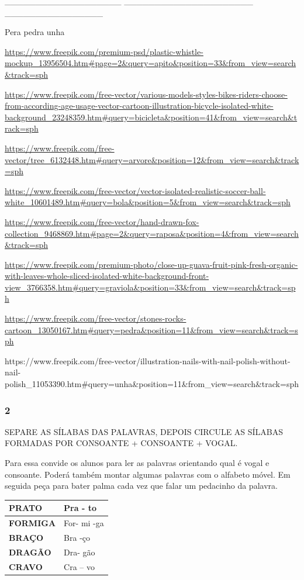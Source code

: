 \_\_\_\_\_\_\_\_\_\_\_\_\_\_\_\_\_\_\_
\_\_\_\_\_\_\_\_\_\_\_\_\_\_\_\_\_\_\_\_\_
\_\_\_\_\_\_\_\_\_\_\_\_\_\_\_\_

Pera pedra unha

\url{https://www.freepik.com/premium-psd/plastic-whistle-mockup_13956504.htm\#page=2\&query=apito\&position=33\&from_view=search\&track=sph}

\url{https://www.freepik.com/free-vector/various-models-styles-bikes-riders-choose-from-according-age-usage-vector-cartoon-illustration-bicycle-isolated-white-background_23248359.htm\#query=bicicleta\&position=41\&from_view=search\&track=sph}

\url{https://www.freepik.com/free-vector/tree_6132448.htm\#query=arvore\&position=12\&from_view=search\&track=sph}

\url{https://www.freepik.com/free-vector/vector-isolated-realistic-soccer-ball-white_10601489.htm\#query=bola\&position=5\&from_view=search\&track=sph}

\url{https://www.freepik.com/free-vector/hand-drawn-fox-collection_9468869.htm\#page=2\&query=raposa\&position=4\&from_view=search\&track=sph}

\url{https://www.freepik.com/premium-photo/close-up-guava-fruit-pink-fresh-organic-with-leaves-whole-sliced-isolated-white-background-front-view_3766358.htm\#query=graviola\&position=33\&from_view=search\&track=sph}

\url{https://www.freepik.com/free-vector/stones-rocks-cartoon_13050167.htm\#query=pedra\&position=11\&from_view=search\&track=sph}

https://www.freepik.com/free-vector/illustration-nails-with-nail-polish-without-nail-polish\_11053390.htm\#query=unha\&position=11\&from\_view=search\&track=sph

\subsubsection{2 }\label{section-16}

SEPARE AS SÍLABAS DAS PALAVRAS, DEPOIS CIRCULE AS SÍLABAS FORMADAS POR
CONSOANTE + CONSOANTE + VOGAL.

Para essa convide os alunos para ler as palavras orientando qual é vogal
e consoante. Poderá também montar algumas palavras com o alfabeto móvel.
Em seguida peça para bater palma cada vez que falar um pedacinho da
palavra.

\begin{longtable}[]{@{}ll@{}}
\toprule
\textbf{PRATO} & Pra - to\tabularnewline
\midrule
\endhead
\textbf{FORMIGA} & For- mi -ga\tabularnewline
\textbf{BRAÇO} & Bra -ço\tabularnewline
\textbf{DRAGÃO} & Dra- gão\tabularnewline
\textbf{CRAVO} & Cra -- vo\tabularnewline
\bottomrule
\end{longtable}

